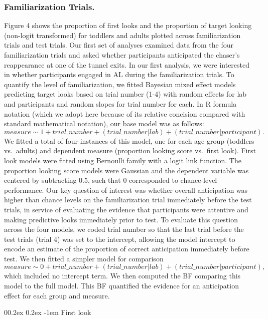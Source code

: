 \documentclass[
  man,floatsintext]{apa6}
\makeatletter
\let\oldparagraph\paragraph
\renewcommand{\paragraph}{
    \@ifstar
      \xxxParagraphStar
      \xxxParagraphNoStar
  }
\newcommand{\xxxParagraphStar}[1]{\oldparagraph*{#1}\mbox{}}
\newcommand{\xxxParagraphNoStar}[1]{\oldparagraph{#1}\mbox{}}
\renewcommand{\paragraph}{\@startsection{paragraph}{4}{\parindent}%
  {0\baselineskip \@plus 0.2ex \@minus 0.2ex}%
  {-1em}%
  {\normalfont\normalsize\bfseries\itshape\typesectitle}}
\makeatother
\begin{document}
\subsubsection{Familiarization Trials.}\label{familiarization-trials.}

Figure 4 shows the proportion of first looks and the proportion of target looking (non-logit transformed) for toddlers and adults plotted across familiarization trials and test trials. Our first set of analyses examined data from the four familiarization trials and asked whether participants anticipated the chaser's reappearance at one of the tunnel exits. In our first analysis, we were interested in whether participants engaged in AL during the familiarization trials. To quantify the level of familiarization, we fitted Bayesian mixed effect models predicting target looks based on trial number (1-4) with random effects for lab and participants and random slopes for trial number for each.
In R formula notation (which we adopt here because of its relative concision compared with standard mathematical notation), our base model was as follows:
\(measure \sim 1 + trial\_number +  (trial\_number | lab) + (trial\_number | participant).\)
We fitted a total of four instances of this model, one for each age group (toddlers vs.~adults) and dependent measure (proportion looking score vs.~first look). First look models were fitted using Bernoulli family with a logit link function. The proportion looking score models were Gaussian and the dependent variable was centered by subtracting 0.5, such that 0 corresponded to chance-level performance.
Our key question of interest was whether overall anticipation was higher than chance levels on the familiarization trial immediately before the test trials, in service of evaluating the evidence that participants were attentive and making predictive looks immediately prior to test. To evaluate this question across the four models, we coded trial number so that the last trial before the test trials (trial 4) was set to the intercept, allowing the model intercept to encode an estimate of the proportion of correct anticipation immediately before test. We then fitted a simpler model for comparison
\(measure \sim 0 + trial\_number +  (trial\_number | lab) + (trial\_number | participant),\)
which included no intercept term. We then computed the BF comparing this model to the full model. This BF quantified the evidence for an anticipation effect for each group and measure.

\paragraph{First look}\label{first-look}
\end{document}
